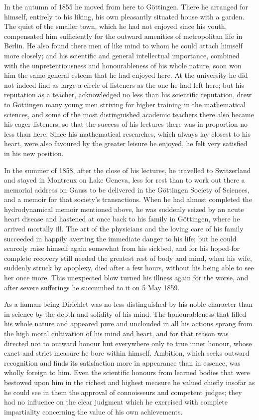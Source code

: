 \documentclass[11pt]{article}
\begin{document}
In the autumn of 1855 he moved from here to Göttingen. There he arranged for himself, entirely to his liking, his own pleasantly situated house with a garden. The quiet of the smaller town, which he had not enjoyed since his youth, compensated him sufficiently for the outward amenities of metropolitan life in Berlin. He also found there men of like mind to whom he could attach himself more closely; and his scientific and general intellectual importance, combined with the unpretentiousness and honourableness of his whole nature, soon won him the same general esteem that he had enjoyed here. At the university he did not indeed find as large a circle of listeners as the one he had left here; but his reputation as a teacher, acknowledged no less than his scientific reputation, drew to Göttingen many young men striving for higher training in the mathematical sciences, and some of the most distinguished academic teachers there also became his eager listeners, so that the success of his lectures there was in proportion no less than here. Since his mathematical researches, which always lay closest to his heart, were also favoured by the greater leisure he enjoyed, he felt very satisfied in his new position.

In the summer of 1858, after the close of his lectures, he travelled to Switzerland and stayed in Montreux on Lake Geneva, less for rest than to work out there a memorial address on Gauss to be delivered in the Göttingen Society of Sciences, and a memoir for that society's transactions. When he had almost completed the hydrodynamical memoir mentioned above, he was suddenly seized by an acute heart disease and hastened at once back to his family in Göttingen, where he arrived mortally ill. The art of the physicians and the loving care of his family succeeded in happily averting the immediate danger to his life; but he could scarcely raise himself again somewhat from his sickbed, and for his hoped-for complete recovery still needed the greatest rest of body and mind, when his wife, suddenly struck by apoplexy, died after a few hours, without his being able to see her once more. This unexpected blow turned his illness again for the worse, and after severe sufferings he succumbed to it on 5 May 1859.

As a human being Dirichlet was no less distinguished by his noble character than in science by the depth and solidity of his mind. The honourableness that filled his whole nature and appeared pure and unclouded in all his actions sprang from the high moral cultivation of his mind and heart, and for that reason was directed not to outward honour but everywhere only to true inner honour, whose exact and strict measure he bore within himself. Ambition, which seeks outward recognition and finds its satisfaction more in appearance than in essence, was wholly foreign to him. Even the scientific honours from learned bodies that were bestowed upon him in the richest and highest measure he valued chiefly insofar as he could see in them the approval of connoisseurs and competent judges; they had no influence on the clear judgment which he exercised with complete impartiality concerning the value of his own achievements.
\end{document}
